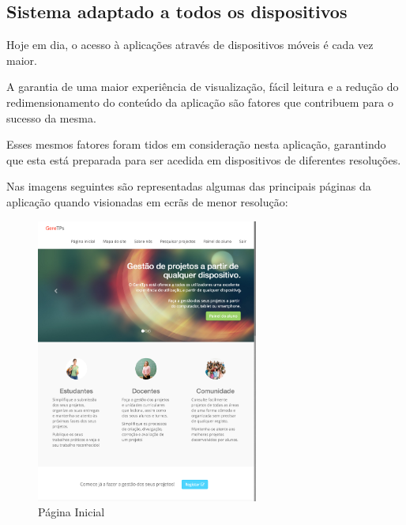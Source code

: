 \subsection{Sistema adaptado a todos os dispositivos}
Hoje em dia, o acesso à aplicações \textwidth{web} através de dispositivos móveis é cada vez maior.

A garantia de uma maior experiência de visualização, fácil leitura e a redução do redimensionamento do conteúdo da aplicação são fatores que contribuem para o sucesso da mesma.

Esses mesmos fatores foram tidos em consideração nesta aplicação, garantindo que esta está preparada para ser acedida em dispositivos de diferentes resoluções.

Nas imagens seguintes são representadas algumas das principais páginas da aplicação quando visionadas em ecrãs de menor resolução:

\begin{figure}[H]
	\centering
 	\includegraphics[width=0.65\textwidth,center]{images/implementacao/alunos/home}
 	\caption{Página Inicial}
 	\label{fig:home_smal}
 \end{figure}

